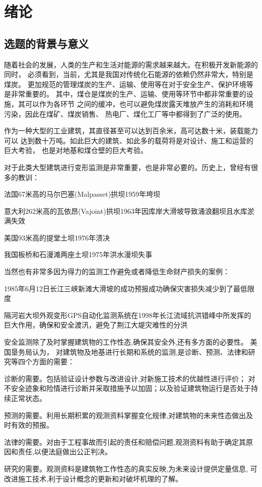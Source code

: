 
\chapter{绪论}
\label{chap00}

\section{选题的背景与意义}
随着社会的发展，人类的生产和生活对能源的需求越来越大。在积极开发新能源的同时，
必须看到，当前，尤其是我国对传统化石能源的依赖仍然非常大，特别是煤炭。
更加规范的管理煤炭的生产、运输、使用等在对于安全生产、保护环境等是非常重要的。
其中，煤仓是煤炭的生产、运输、使用等环节中都非常重要的设施，其可以作为各环节
之间的缓冲，也可以避免煤炭露天堆放产生的消耗和环境污染，因此在煤矿、煤炭销售、
热电厂、煤化工厂等中都得到了广泛的使用。

作为一种大型的工业建筑，其直径甚至可以达到百余米，高可达数十米，装载能力可以
达到数十万吨。如此巨大的建筑、如此多的载荷将是对设计、施工和运营的巨大考验，
也是对地基和煤仓壁的巨大考验。

对于此类大型建筑进行变形监测是非常重要，也是非常必要的。历史上，曾经有很多的教训：
\begin{asparaitem}[$\bullet$]
\item 法国67米高的马尔巴塞(Malpasset)拱坝1959年垮坝
\item 意大利262米高的瓦依昂(Vajoint)拱坝1963年因库岸大滑坡导致涌浪翻坝且水库淤满失效
\item 美国93米高的提堂土坝1976年溃决
\item 我国板桥和石漫滩两座土坝1975年洪水漫坝失事
\end{asparaitem}
当然也有非常多因为得力的监测工作避免或者降低生命财产损失的案例：
\begin{asparaitem}[$\bullet$]
\item 1985年6月12日长江三峡新滩大滑坡的成功预报成功确保灾害损失减少到了最低限度
\item 隔河岩大坝外观变形GPS自动化监测系统在1998年长江流域抗洪错峰中所发挥的巨大作用，确保和安全渡汛，避免了荆江大堤灾难性的分洪
\end{asparaitem}

安全监测除了及时掌握建筑物的工作性态,确保其安全外,还有多方面的必要性。
美国垦务局认为，
对建筑物及地基进行长期和系统的监测,是诊断、预测、法律和研究等四个方面的需要：
\begin{asparaitem}[$\bullet$]
\item 诊断的需要。包括验证设计参数与改进设计,对新施工技术的优越性进行评价；
对不安全迹象和险情进行诊断并采取措施予以加固；以及验证建筑物运行是否处于持续正常状态。
\item 预测的需要。利用长期积累的观测资料掌握变化规律,对建筑物的未来性态做出及时有效的预报。
\item 法律的需要。对由于工程事故而引起的责任和赔偿问题,观测资料有助于确定其原因和责任,以便法庭做出公正判决。
\item 研究的需要。观测资料是建筑物工作性态的真实反映,为未来设计提供定量信息,
可改进施工技术,利于设计概念的更新和对破坏机理的了解。
\end{asparaitem}

